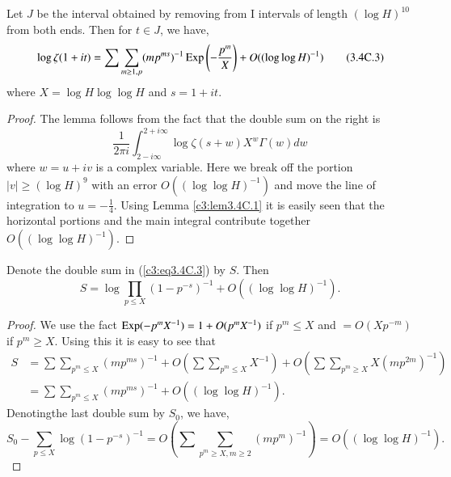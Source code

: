 \begin{alphlemma}\label{c3:lem3.4C.2}
Let $J$ be the interval obtained by removing from I intervals of length $(\log H)^{10}$ from both ends. Then for $t \in J$, we have,
\begin{equation*}
\log \zeta (1+ it) = \sum \sum\limits_{m \geq 1, p} (mp^{ms})^{-1} \operatorname{Exp} \left(-\frac{p^m}{X}  \right) + O ((\log \log H)^{-1})  \tag{3.4C.3}\label{c3:eq3.4C.3}
\end{equation*}
where $X = \log H \log \log H$ and $s = 1+ it$.
\end{alphlemma}

\begin{proof}
The lemma follows from the fact that the double sum on the right is 
\begin{equation*}
\frac{1}{2\pi i} \int^{2+i\infty}_{2-i\infty} \log \zeta(s+w) X^w \Gamma(w) dw  \tag{3.4C.4}\label{c3:eq3.4C.4}
\end{equation*}
where $w = u + iv$ is a complex variable. Here we break off the portion $|v| \geq (\log H)^9$ with an error $O((\log \log H)^{-1})$ and move the line of integration to $u= - \frac{1}{4}$. Using Lemma \ref{c3:lem3.4C.1} it is easily seen that the horizontal portions and the main integral contribute together $O((\log \log H)^{-1})$.
\end{proof}

\begin{alphlemma}\label{c3:lem3.4C.3}
Denote the double sum in (\ref{c3:eq3.4C.3}) by $S$. Then
\begin{equation*}
S = \log \prod\limits_{p \leq X} (1-p^{-s})^{-1} + O((\log \log H)^{-1}) .  \tag{3.4C.5}\label{c3:eq3.4C.5}
\end{equation*}
\end{alphlemma}

\begin{proof}
We use the fact $\operatorname{Exp} (-p^m X^{-1}) =1 + O(p^m X^{-1})$ if $p^m \leq X$ and $= O(X p^{-m})$ if $p^m \geq X$. Using this it is easy to see that
\begin{align*}
S & = \sum \sum\limits_{p^m \leq X} (mp^{ms})^{-1} + O \left( \sum\sum\limits_{p^m \leq X} X^{-1}\right) + O \left( \sum\sum\limits_{p^m \geq X} X(mp^{2m})^{-1}\right)\\
& = \sum\sum\limits_{p^m \leq X} (mp^{ms})^{-1} + O((\log \log H)^{-1}). 
\end{align*}
Denoting\pageoriginale the last double sum by $S_0$, we have,
$$
S_0 - \sum\limits_{p\leq X} \log (1-p^{-s})^{-1} = O\left( \sum \sum\limits_{p^m \geq X, m \geq 2} (mp^m)^{-1}\right) = O((\log \log H)^{-1}). 
$$
\end{proof}

